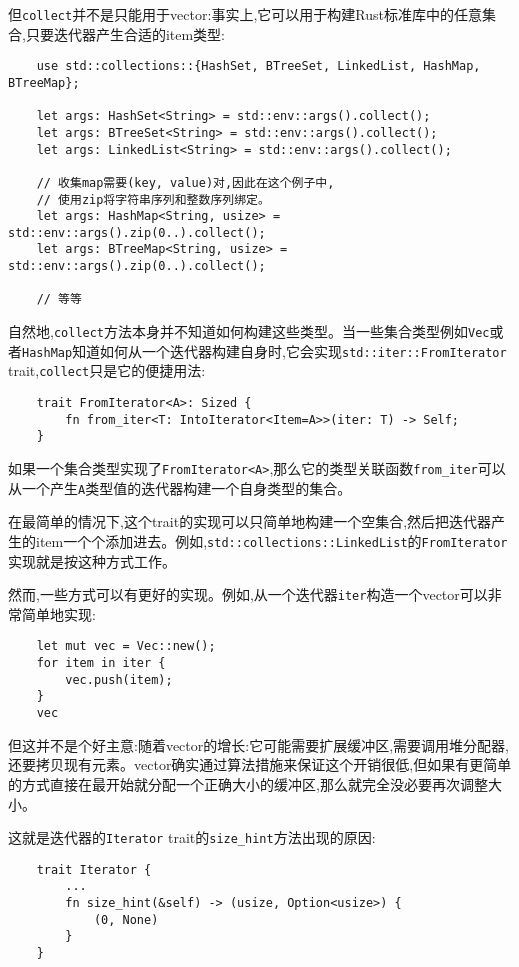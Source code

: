但\texttt{collect}并不是只能用于vector:事实上,它可以用于构建Rust标准库中的任意集合,只要迭代器产生合适的item类型:
\begin{verbatim}
    use std::collections::{HashSet, BTreeSet, LinkedList, HashMap, BTreeMap};

    let args: HashSet<String> = std::env::args().collect();
    let args: BTreeSet<String> = std::env::args().collect();
    let args: LinkedList<String> = std::env::args().collect();

    // 收集map需要(key, value)对,因此在这个例子中,
    // 使用zip将字符串序列和整数序列绑定。
    let args: HashMap<String, usize> = std::env::args().zip(0..).collect();
    let args: BTreeMap<String, usize> = std::env::args().zip(0..).collect();

    // 等等
\end{verbatim}
自然地,\texttt{collect}方法本身并不知道如何构建这些类型。当一些集合类型例如\texttt{Vec}或者\texttt{HashMap}知道如何从一个迭代器构建自身时,它会实现\texttt{std::iter::FromIterator} trait,\texttt{collect}只是它的便捷用法:
\begin{verbatim}
    trait FromIterator<A>: Sized {
        fn from_iter<T: IntoIterator<Item=A>>(iter: T) -> Self;
    }
\end{verbatim}
如果一个集合类型实现了\texttt{FromIterator<A>},那么它的类型关联函数\texttt{from\_iter}可以从一个产生\texttt{A}类型值的迭代器构建一个自身类型的集合。

在最简单的情况下,这个trait的实现可以只简单地构建一个空集合,然后把迭代器产生的item一个个添加进去。例如,\texttt{std::collections::LinkedList}的\texttt{FromIterator}实现就是按这种方式工作。

然而,一些方式可以有更好的实现。例如,从一个迭代器\texttt{iter}构造一个vector可以非常简单地实现:
\begin{verbatim}
    let mut vec = Vec::new();
    for item in iter {
        vec.push(item);
    }
    vec
\end{verbatim}

但这并不是个好主意:随着vector的增长:它可能需要扩展缓冲区,需要调用堆分配器,还要拷贝现有元素。vector确实通过算法措施来保证这个开销很低,但如果有更简单的方式直接在最开始就分配一个正确大小的缓冲区,那么就完全没必要再次调整大小。

这就是迭代器的\texttt{Iterator} trait的\texttt{size\_hint}方法出现的原因:
\begin{verbatim}
    trait Iterator {
        ...
        fn size_hint(&self) -> (usize, Option<usize>) {
            (0, None)
        }
    }
\end{verbatim}

